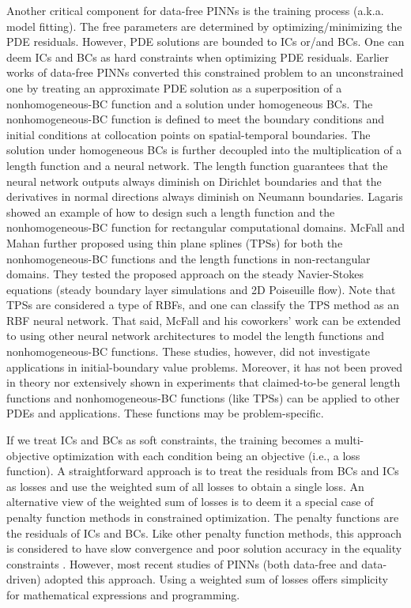 Another critical component for data-free PINNs is the training process (a.k.a. model fitting).
The free parameters are determined by optimizing/minimizing the PDE residuals.
However, PDE solutions are bounded to ICs or/and BCs.
One can deem ICs and BCs as hard constraints when optimizing PDE residuals.
Earlier works of data-free PINNs converted this constrained problem to an unconstrained one by treating an approximate PDE solution as a superposition of a nonhomogeneous-BC function and a solution under homogeneous BCs.
The nonhomogeneous-BC function is defined to meet the boundary conditions and initial conditions at collocation points on spatial-temporal boundaries.
The solution under homogeneous BCs is further decoupled into the multiplication of a length function and a neural network. 
The length function guarantees that the neural network outputs always diminish on Dirichlet boundaries and that the derivatives in normal directions always diminish on Neumann boundaries.
Lagaris \cite{lagaris_artificial_1998} showed an example of how to design such a length function and the nonhomogeneous-BC function for rectangular computational domains.
McFall and Mahan \cite{McFall2009} further proposed using thin plane splines (TPSs) for both the nonhomogeneous-BC functions and the length functions in non-rectangular domains.
They tested the proposed approach on the steady Navier-Stokes equations (steady boundary layer simulations and 2D Poiseuille flow). 
Note that TPSs are considered a type of RBFs, and one can classify the TPS method as an RBF neural network.
That said, McFall and his coworkers' work can be extended to using other neural network architectures to model the length functions and nonhomogeneous-BC functions.
These studies, however, did not investigate applications in initial-boundary value problems.
Moreover, it has not been proved in theory nor extensively shown in experiments that claimed-to-be general length functions and nonhomogeneous-BC functions (like TPSs) can be applied to other PDEs and applications.
These functions may be problem-specific.

If we treat ICs and BCs as soft constraints, the training becomes a multi\hyp{}objective optimization with each condition being an objective (i.e., a loss function).
A straightforward approach is to treat the residuals from BCs and ICs as losses and use the weighted sum of all losses to obtain a single loss. 
An alternative view of the weighted sum of losses is to deem it a special case of penalty function methods in constrained optimization.
The penalty functions are the residuals of ICs and BCs.
Like other penalty function methods, this approach is considered to have slow convergence and poor solution accuracy in the equality constraints \cite{rudd_constrained_2014}.
However, most recent studies of PINNs (both data-free and data-driven) adopted this approach.
Using a weighted sum of losses offers simplicity for mathematical expressions and programming.

